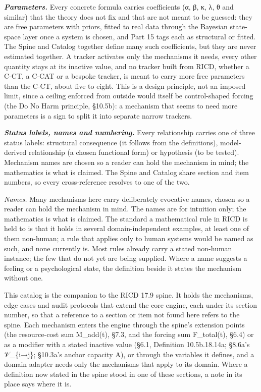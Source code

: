 \documentclass[
]{article}
\begin{document}
\emph{\textbf{Parameters.}} Every concrete formula carries coefficients
(α, β, κ, λ, θ and similar) that the theory does not fix and that are
not meant to be guessed: they are free parameters with priors, fitted to
real data through the Bayesian state-space layer once a system is
chosen, and Part 15 tags each as structural or fitted. The Spine and
Catalog together define many such coefficients, but they are never
estimated together. A tracker activates only the mechanisms it needs,
every other quantity stays at its inactive value, and no tracker built
from RICD, whether a C-CT, a C-CAT or a bespoke tracker, is meant to
carry more free parameters than the C-CT, about five to eight. This is a
design principle, not an imposed limit, since a ceiling enforced from
outside would itself be control-shaped forcing (the Do No Harm
principle, §10.5b): a mechanism that seems to need more parameters is a
sign to split it into separate narrow trackers.

\emph{\textbf{Status labels, names and numbering.}} Every relationship
carries one of three status labels: structural consequence (it follows
from the definitions), model-derived relationship (a chosen functional
form) or hypothesis (to be tested). Mechanism names are chosen so a
reader can hold the mechanism in mind; the mathematics is what is
claimed. The Spine and Catalog share section and item numbers, so every
cross-reference resolves to one of the two.

\emph{Names.} Many mechanisms here carry deliberately evocative names,
chosen so a reader can hold the mechanism in mind. The names are for
intuition only; the mathematics is what is claimed. The standard a
mathematical rule in RICD is held to is that it holds in several
domain-independent examples, at least one of them non-human; a rule that
applies only to human systems would be named as such, and none currently
is. Most rules already carry a stated non-human instance; the few that
do not yet are being supplied. Where a name suggests a feeling or a
psychological state, the definition beside it states the mechanism
without one.

This catalog is the companion to the RICD 17.9 spine. It holds the
mechanisms, edge cases and audit protocols that extend the core engine,
each under its section number, so that a reference to a section or item
not found here refers to the spine. Each mechanism enters the engine
through the spine's extension points (the resource-cost sum M\_add(t),
§7.3, and the forcing sum F\_total(t), §6.4) or as a modifier with a
stated inactive value (§6.1, Definition 10.5b.18.14a; §8.6a's
𝒱\_\{i→j\}; §10.3a's anchor capacity A), or through the variables it
defines, and a domain adapter needs only the mechanisms that apply to
its domain. Where a definition now stated in the spine stood in one of
these sections, a note in its place says where it is.
\end{document}
